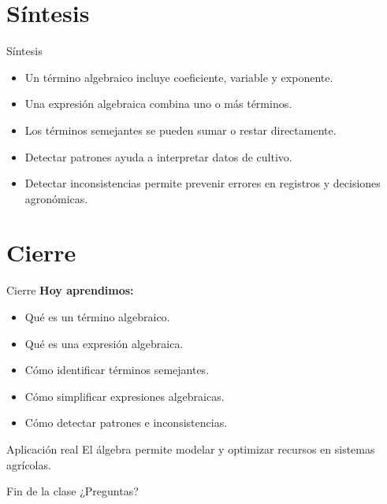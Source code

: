 \documentclass[handout,aspectratio=169,12pt]{beamer}
\begin{document}
	\section{Síntesis}
	\begin{frame}{Síntesis}
		\begin{itemize}[<+->]
			\item Un término algebraico incluye coeficiente, variable y exponente.
			\item Una expresión algebraica combina uno o más términos.
			\item Los términos semejantes se pueden sumar o restar directamente.
			\item Detectar patrones ayuda a interpretar datos de cultivo.
			\item Detectar inconsistencias permite prevenir errores en registros y decisiones agronómicas.
		\end{itemize}
	\end{frame}
	
	\section{Cierre}
	\begin{frame}{Cierre}
		\textbf{Hoy aprendimos:}
		\begin{itemize}[<+->]
			\item Qué es un término algebraico.
			\item Qué es una expresión algebraica.
			\item Cómo identificar términos semejantes.
			\item Cómo simplificar expresiones algebraicas.
			\item Cómo detectar patrones e inconsistencias.
		\end{itemize}
		
		\pause
		\begin{block}{Aplicación real}
			El álgebra permite modelar y optimizar recursos en sistemas agrícolas.
		\end{block}
	\end{frame}
	
	\begin{frame}{Fin de la clase}
		\centering
		\Huge ¿Preguntas?
	\end{frame}
	
\end{document}
